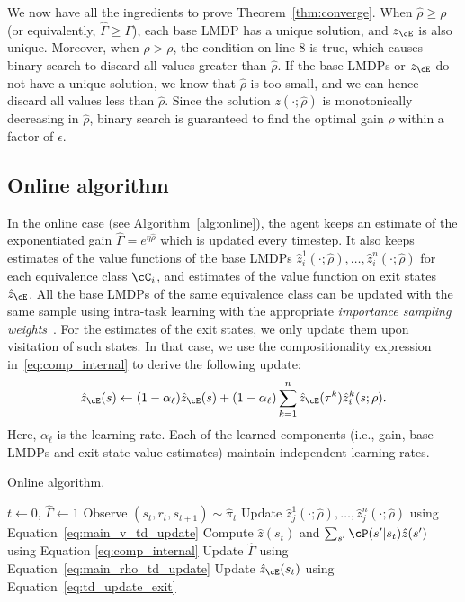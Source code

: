 We now have all the ingredients to prove Theorem~\ref{thm:converge}. When $\hat\rho\geq\rho$ (or equivalently, $\widehat\Gamma\geq\Gamma$), each base LMDP has a unique solution, and $z_\cE$ is also unique. Moreover, when $\hat\rho>\rho$, the condition on line 8 is true, which causes binary search to discard all values greater than $\hat\rho$. If the base LMDPs or $z_\cE$ do not have a unique solution, we know that $\hat\rho$ is too small, and we can hence discard all values less than $\hat\rho$. Since the solution $z(\cdot;\hat\rho)$ is monotonically decreasing in $\hat\rho$, binary search is guaranteed to find the optimal gain $\rho$ within a factor of $\epsilon$.

\subsection{Online algorithm}
 In the online case (see Algorithm~\ref{alg:online}), the agent keeps an estimate of the exponentiated gain $\widehat\Gamma=e^{\eta\hat\rho}$ which is updated every timestep. It also keeps estimates of the value functions of the base LMDPs $\hat z_i^1(\cdot;\hat\rho),\ldots,\hat z_i^n(\cdot;\hat\rho)$ for each equivalence class $\cC_i$, and estimates of the value function on exit states $\hat z_\cE$.  All the base LMDPs of the same equivalence class can be updated with the same sample using intra-task learning with the appropriate {\it importance sampling weights\/}~\citep{Jonsson2016}. For the estimates of the exit states, we only update them upon visitation of such states. In that case, we use the compositionality expression in~\eqref{eq:comp_internal} to derive the following update:
\begin{equation}
  \hat z_\cE(s)\gets (1-\alpha_\ell) \hat z_\cE(s) + (1-\alpha_\ell) \sum_{k=1}^n \hat z_\cE(\tau^k) \hat z_i^k(s;\rho).
  \label{eq:td_update_exit}
\end{equation}
Here, $\alpha_\ell$ is the learning rate. Each of the learned components (i.e., gain, base LMDPs and exit state value estimates) maintain independent learning rates.

\begin{algorithm}[!htpb]
  \caption{Online algorithm.}
  \begin{algorithmic}[1]
    \State $t \gets 0$, $\widehat{\Gamma} \gets 1$
    \State Observe $(s_{t}, r_{t}, s_{t+1})\sim\hat\pi_t$
    \State Update $\hat z_j^1(\cdot;\hat\rho),\ldots,\hat z_j^n(\cdot;\hat\rho)$ using Equation~\eqref{eq:main_v_td_update}
    \State Compute $\hat z(s_t)$ and $\sum_{s'}\cP(s'|s_t)\hat z(s')$ using Equation \eqref{eq:comp_internal}
    \State Update $\widehat\Gamma$ using Equation~\eqref{eq:main_rho_td_update}
    \State Update $\hat z_\cE(s_t)$ using Equation~\eqref{eq:td_update_exit}
    \EndIf
    \EndWhile
  \end{algorithmic}
  \label{alg:online}
\end{algorithm}

